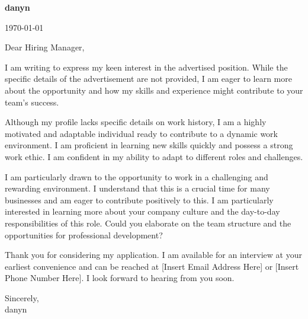 \documentclass[letterpaper,11pt]{article}
\begin{document}
\textbf{danyn} \\
\vspace{20pt}

\today \\
\vspace{20pt}

Dear Hiring Manager, \\
\vspace{10pt}

I am writing to express my keen interest in the advertised position.  While the specific details of the advertisement are not provided, I am eager to learn more about the opportunity and how my skills and experience might contribute to your team's success.


Although my profile lacks specific details on work history, I am a highly motivated and adaptable individual ready to contribute to a dynamic work environment.  I am proficient in learning new skills quickly and possess a strong work ethic.  I am confident in my ability to adapt to different roles and challenges.


I am particularly drawn to the opportunity to work in a challenging and rewarding environment.  I understand that this is a crucial time for many businesses and am eager to contribute positively to this.  I am particularly interested in learning more about your company culture and the day-to-day responsibilities of this role.  Could you elaborate on the team structure and the opportunities for professional development?


Thank you for considering my application. I am available for an interview at your earliest convenience and can be reached at [Insert Email Address Here] or [Insert Phone Number Here]. I look forward to hearing from you soon.

\vspace{20pt}

Sincerely, \\
\vspace{40pt}
danyn
\end{document}
